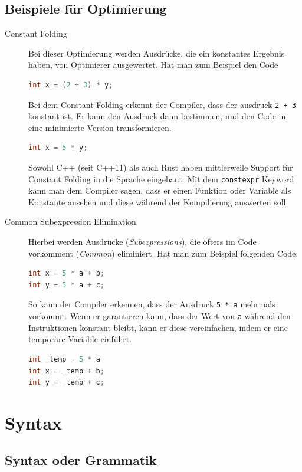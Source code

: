 \documentclass[ngerman,abstract=true]{scrartcl}
\begin{document}
\subsection{Beispiele für Optimierung}

\begin{description}
\item[Constant Folding] Bei dieser Optimierung werden Ausdrücke, die ein konstantes Ergebnis haben, von Optimierer ausgewertet. Hat man zum Beispiel den Code
\begin{lstlisting}[language=C]
int x = (2 + 3) * y;
\end{lstlisting}
Bei dem Constant Folding erkennt der Compiler, dass der ausdruck \verb|2 + 3| konstant ist. Er kann den Ausdruck dann bestimmen, und den Code in eine minimierte Version transformieren.
\begin{lstlisting}[language=C]
int x = 5 * y;
\end{lstlisting}
\begin{anmerkung}
Sowohl C++ (seit C++11) als auch Rust haben mittlerweile Support für Constant Folding in die Sprache eingebaut. Mit dem \verb|constexpr| Keyword kann man dem Compiler sagen, dass er einen Funktion oder Variable als Konstante ansehen und diese während der Kompilierung auswerten soll.
\end{anmerkung}
\item[Common Subexpression Elimination] Hierbei werden Ausdrücke (\emph{Subexpressions}), die öfters im Code vorkomment (\emph{Common}) eliminiert. Hat man zum Beispiel folgenden Code:
\begin{lstlisting}[language=C]
int x = 5 * a + b;
int y = 5 * a + c;
\end{lstlisting}
So kann der Compiler erkennen, dass der Ausdruck \verb|5 * a| mehrmals vorkommt. Wenn er garantieren kann, dass der Wert von \verb|a| während den Instruktionen konstant bleibt, kann er diese vereinfachen, indem er eine temporäre Variable einführt.
\begin{lstlisting}[language=C]
int _temp = 5 * a
int x = _temp + b;
int y = _temp + c;
\end{lstlisting}
\end{description}


\section{Syntax}

\subsection{Syntax oder Grammatik}
\end{document}
